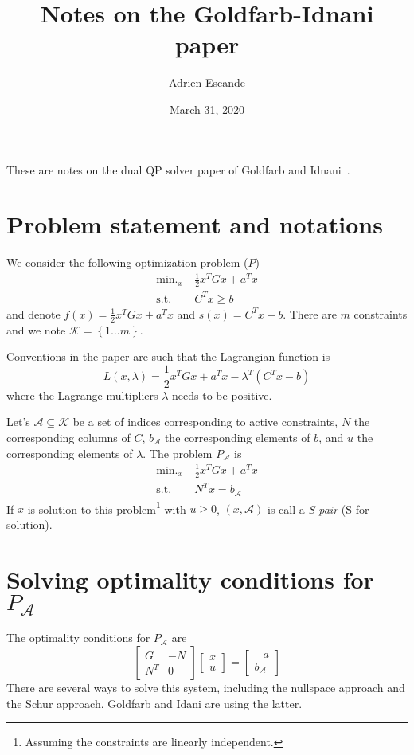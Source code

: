 \documentclass[11pt,a4paper]{article}
\newcommand{\BIN}{\begin{bmatrix}}
\newcommand{\BOUT}{\end{bmatrix}}
\DeclareMathOperator*{\minimize}{\min.}
\newcommand{\st}{\mbox{s.t.}}
\newcommand{\half}{\frac{1}{2}}
\newcommand{\act}{\mathcal{A}}
\begin{document}
\date{March 31, 2020}
\author{Adrien Escande}

\title{Notes on the Goldfarb-Idnani paper}
\maketitle

These are notes on the dual QP solver paper of Goldfarb and Idnani~\cite{Goldfarb:mp:1983}.

\section{Problem statement and notations}
We consider the following optimization problem ($P$)
\begin{align}
	\minimize_x &\ \half x^T G x + a^T x \\
	\st &\ C^T x \geq b
\end{align}
and denote $f(x) = \half x^T G x + a^T x$ and $s(x) = C^T x - b$.
There are $m$ constraints and we note $\mathcal{K} = \left\{1 \ldots m\right\}$.

Conventions in the paper are such that the Lagrangian function is
\begin{equation}
	L(x,\lambda) = \half x^T G x + a^T x - \lambda^T(C^T x - b)
\end{equation}
where the Lagrange multipliers $\lambda$ needs to be positive.

Let's $\mathcal{A} \subseteq \mathcal{K}$ be a set of indices corresponding to active constraints, $N$ the corresponding columns of $C$, $b_\mathcal{A}$ the corresponding elements of $b$, and $u$ the corresponding elements of $\lambda$. The problem $P_\mathcal{A}$ is
\begin{align}
	\minimize_x &\ \half x^T G x + a^T x \\
	\st &\ N^T x = b_\mathcal{A}
\end{align}
If $x$ is solution to this problem\footnote{Assuming the constraints are linearly independent.} with $u\geq 0$, $(x,\act)$ is call a \emph{S-pair} (S for solution).

\section{Solving optimality conditions for $P_\act$}
The optimality conditions for $P_\act$ are
\begin{equation}
	\BIN G & -N \\ N^T & 0 \BOUT \BIN x \\ u \BOUT = \BIN -a \\ b_\act \BOUT \label{eq:optimPA}
\end{equation}
There are several ways to solve this system, including the nullspace approach and the Schur approach\cite[Chap. 16]{nocedal:book:2006}. Goldfarb and Idani are using the latter.
\end{document}
